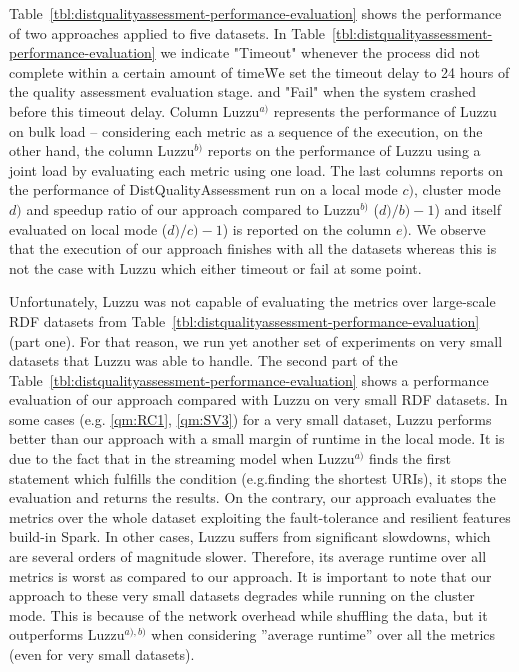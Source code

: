 Table~\ref{tbl:distqualityassessment-performance-evaluation} shows the performance of two approaches applied to five datasets.
In Table~\ref{tbl:distqualityassessment-performance-evaluation} we indicate "Timeout" whenever the process did not complete within a certain amount of time\f{We set the timeout delay to 24 hours of the quality assessment evaluation stage.} and "Fail" when the system crashed before this timeout delay.
Column Luzzu$^{a)}$ represents the performance of Luzzu on bulk load -- considering each metric as a sequence of the execution, on the other hand, the column Luzzu$^{b)}$ reports on the performance of Luzzu using a joint load by evaluating each metric using one load.
The last columns reports on the performance of DistQualityAssessment run on a local mode $c)$, cluster mode $d)$ and speedup ratio of our approach compared to Luzzu$^{b)}$ ($d)/b)-1$) and itself evaluated on local mode ($d)/c)-1$) is reported on the column $e)$.
We observe that the execution of our approach finishes with all the datasets whereas this is not the case with Luzzu which either timeout or fail at some point.

Unfortunately, Luzzu was not capable of evaluating the metrics over large-scale \gls{RDF} datasets from Table~\ref{tbl:distqualityassessment-performance-evaluation} (part one). 
For that reason, we run yet another set of experiments on very small datasets that Luzzu was able to handle. 
The second part of the Table~\ref{tbl:distqualityassessment-performance-evaluation} shows a performance evaluation of our approach compared with Luzzu on very small \gls{RDF} datasets.
In some cases (e.g. \ref{qm:RC1}, \ref{qm:SV3}) for a very small dataset, Luzzu performs better than our approach with a small margin of runtime in the local mode.
It is due to the fact that in the streaming model when Luzzu$^{a)}$ finds the first statement which fulfills the condition (e.g.finding the shortest \gls{URI}s), it stops the evaluation and returns the results.
On the contrary, our approach evaluates the metrics over the whole dataset exploiting the fault-tolerance and resilient features build-in Spark.
In other cases, Luzzu suffers from significant slowdowns, which are several orders of magnitude slower.
Therefore, its average runtime over all metrics is worst as compared to our approach. 
It is important to note that our approach to these very small datasets degrades while running on the cluster mode.
This is because of the network overhead while shuffling the data, but it outperforms Luzzu$^{a),b)}$ when considering ''average runtime'' over all the metrics (even for very small datasets).

